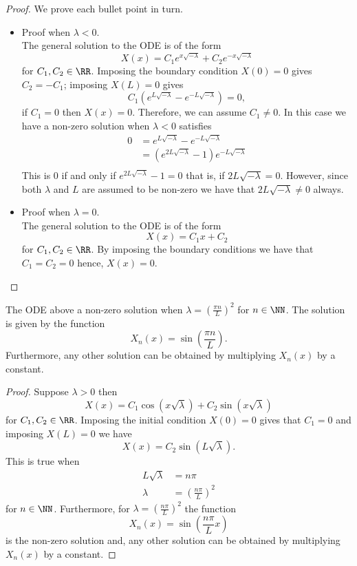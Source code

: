 \documentclass[12pt, a4paper]{article}
\begin{document}
\begin{proof}
    We prove each bullet point in turn.
    \begin{itemize}
        \item Proof when \(\lambda<0\). \\
        The general solution to the ODE is of the form 
        \[X(x)= C_1e^{x\sqrt{-\lambda}}+C_2 e^{-x\sqrt{-\lambda}}\]
        for \(C_1,C_2\in \RR\). Imposing the boundary condition \(X(0)=0\) gives \(C_2 =-C_1\); imposing \(X(L)=0\) gives 
        \[C_1 \left( e^{L \sqrt{-\lambda}}-e^{-L\sqrt{-\lambda}} \right) =0,\]
        if \(C_1=0\) then \(X(x)=0\). Therefore, we can assume \(C_1 \neq 0\). In this case we have a non-zero solution when \(\lambda<0\) satisfies 
        \[\begin{aligned}
            0 &= e^{L \sqrt{-\lambda}}-e^{-L\sqrt{-\lambda}} \\
            &= \left( e^{2L \sqrt{-\lambda}} -1\right)e^{-L \sqrt{-\lambda}} \\
        \end{aligned}\]
        This is \(0\) if and only if \(e^{2L \sqrt{-\lambda}} -1=0\) that is, if \(2L\sqrt{-\lambda}=0\). However, since both \(\lambda\) and \(L\) are assumed to be non-zero we have that \(2L \sqrt{-\lambda} \neq 0\) always.
        \item Proof when \(\lambda=0\). \\
        The general solution to the ODE is of the form 
        \[X(x)=C_1x+C_2\]
        for \(C_1,C_2 \in \RR\). By imposing the boundary conditions we have that \(C_1=C_2=0\) hence, \(X(x) =0\).
    \end{itemize}
\end{proof}

\begin{mdprop}
    The ODE above a non-zero solution when \(\lambda = \left( \frac{\pi n}{L} \right)^2\) for \(n \in \NN\). The solution is given by the function 
    \[X_n(x) = \sin \left(\frac{\pi n}{L} \right) .\]
    Furthermore, any other solution can be obtained by multiplying \(X_n(x)\) by a constant.
\end{mdprop}

\begin{proof}
    Suppose \(\lambda>0\) then 
    \[X(x) = C_1\cos(x\sqrt{\lambda})+C_2\sin(x\sqrt{\lambda})\]
    for \(C_1,C_2 \in \RR\). Imposing the initial condition \(X(0)=0\) gives that \(C_1=0\) and imposing \(X(L)=0\) we have 
    \[X(x)=C_2\sin(L\sqrt{\lambda}).\]
    This is true when
    \[\begin{aligned}
        L\sqrt{\lambda} &= n\pi \\
        \lambda &= \left( \frac{n\pi}{L} \right)^2
    \end{aligned}\]
    for \(n \in \NN\). Furthermore, for \(\lambda = \left( \frac{n\pi}{L} \right)^2\) the function 
    \[X_n(x)=\sin \left( \frac{n\pi}{L} x\right)\]
    is the non-zero solution and, any other solution can be obtained by multiplying \(X_n(x)\) by a constant.
\end{proof}
\end{document}
